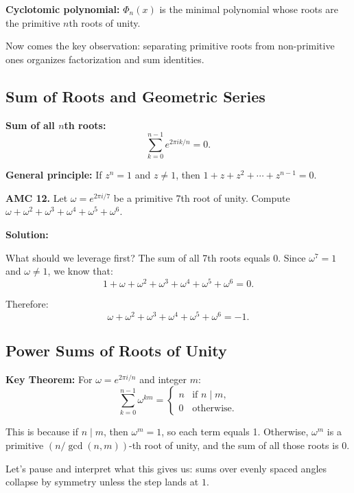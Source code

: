 \documentclass[12pt]{extarticle}
\begin{document}
\textbf{Cyclotomic polynomial:} $\Phi_n(x)$ is the minimal polynomial whose roots are the primitive $n$th roots of unity.

Now comes the key observation: separating primitive roots from non-primitive ones organizes factorization and sum identities.

\subsection*{Sum of Roots and Geometric Series}

\textbf{Sum of all $n$th roots:}
\[
\sum_{k=0}^{n-1} e^{2\pi ik/n} = 0.
\]

\textbf{General principle:} If $z^n = 1$ and $z \neq 1$, then $1 + z + z^2 + \cdots + z^{n-1} = 0$.

\begin{examplebox}
\textbf{AMC 12.} Let $\omega = e^{2\pi i/7}$ be a primitive 7th root of unity. Compute $\omega + \omega^2 + \omega^3 + \omega^4 + \omega^5 + \omega^6$.
\end{examplebox}

\textbf{Solution:}

What should we leverage first? The sum of all 7th roots equals $0$.
Since $\omega^7 = 1$ and $\omega \neq 1$, we know that:
\[
1 + \omega + \omega^2 + \omega^3 + \omega^4 + \omega^5 + \omega^6 = 0.
\]

Therefore:
\[
\omega + \omega^2 + \omega^3 + \omega^4 + \omega^5 + \omega^6 = -1.
\]


\subsection*{Power Sums of Roots of Unity}

\textbf{Key Theorem:} For $\omega = e^{2\pi i/n}$ and integer $m$:
\[
\sum_{k=0}^{n-1} \omega^{km} = \begin{cases}
n & \text{if } n \mid m, \\
0 & \text{otherwise}.
\end{cases}
\]

This is because if $n \mid m$, then $\omega^m = 1$, so each term equals 1. Otherwise, $\omega^m$ is a primitive $(n/\gcd(n,m))$-th root of unity, and the sum of all those roots is 0.

Let’s pause and interpret what this gives us: sums over evenly spaced angles collapse by symmetry unless the step lands at $1$.
\end{document}
